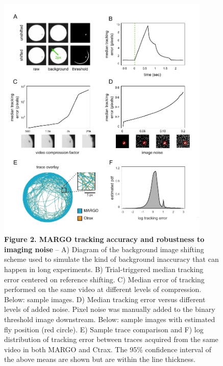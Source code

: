 \documentclass[10pt]{article}
\begin{document}
\newpage
\begin{figure}[h!]
	\begin{center}
		\includegraphics[width=0.9\textwidth]{../figures/autotracker_performance.pdf}
	\end{center}
	\caption*{\footnotesize \textbf{Figure 2. MARGO tracking accuracy and robustness to imaging noise} -- A) Diagram of the background image shifting scheme used to simulate the kind of background inaccuracy that can happen in long experiments. B) Trial-triggered median tracking error centered on reference shifting. C) Median error of tracking performed on the same video at different levels of compression. Below: sample images. D) Median tracking error versus different levels of added noise. Pixel noise was manually added to the binary threshold image downstream. Below: sample images with estimated fly position (red circle). E) Sample trace comparison and F) log distribution of tracking error between traces acquired from the same video in both MARGO and Ctrax. The 95\% confidence interval of the above means are shown but are within the line thickness.}
\end{figure}
\end{document}
